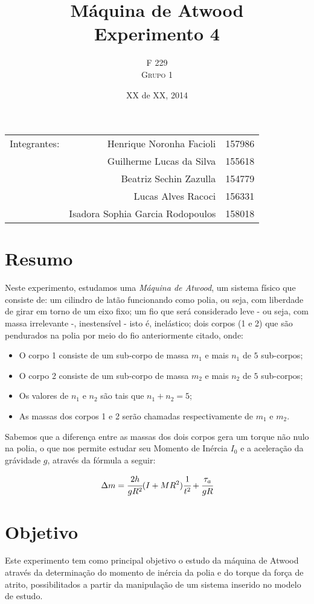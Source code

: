 \documentclass[a4paper]{article}
\title{Máquina de Atwood \\ Experimento 4} %
\author{F 229 \\ \textsc{Grupo 1}}
\date{XX de XX, 2014}
\begin{document}
\maketitle

\begin{center}
	\begin{tabular}{l r l}
		Integrantes: & Henrique Noronha Facioli & 157986 \\
		& Guilherme Lucas da Silva & 155618 \\
		& Beatriz Sechin Zazulla & 154779 \\
		& Lucas Alves Racoci & 156331 \\
		& Isadora Sophia Garcia Rodopoulos & 158018 \\
	\end{tabular}
\end{center}


\section{Resumo}
Neste experimento, estudamos uma \emph{Máquina de Atwood}, um sistema físico que consiste de: um cilindro de latão funcionando como polia, ou seja, com liberdade de girar em torno de um eixo fixo; um fio que será considerado leve - ou seja, com massa irrelevante -, inestensível - isto é, inelástico; dois corpos (1 e 2) que são pendurados na polia por meio do fio anteriormente citado, onde:
\begin{itemize} 
	\item O corpo 1 consiste de um sub-corpo de massa ${m}_{1}$ e mais $n_{1}$ de $5$ sub-corpos; 
	\item O corpo 2 consiste de um sub-corpo de massa ${m}_{2}$ e mais $n_{2}$ de $5$ sub-corpos; 
	\item Os valores de $n_{1}$ e $n_{2}$ são tais que $n_{1}+n_{2}=5$; 
	\item As massas dos corpos 1 e 2 serão chamadas respectivamente de $m_{1}$ e $m_{2}$.
\end {itemize} 

Sabemos que a diferença entre as massas dos dois corpos gera um torque não nulo na polia, o que nos permite estudar seu Momento de Inércia $I_{0}$ e a aceleração da grávidade $g$, através da fórmula a seguir:

\[
\Delta m=\cfrac{2h}{gR^{2}}(I+MR^{2})\ensuremath{\cfrac{1}{t^{2}}}+\cfrac{\tau_{a}}{gR}
\]


\section{Objetivo}
Este experimento tem como principal objetivo o estudo da máquina de Atwood através da determinação do momento de inércia da polia e do torque da força de atrito, possibilitados a partir da manipulação de um sistema inserido no modelo de estudo.
\end{document}
